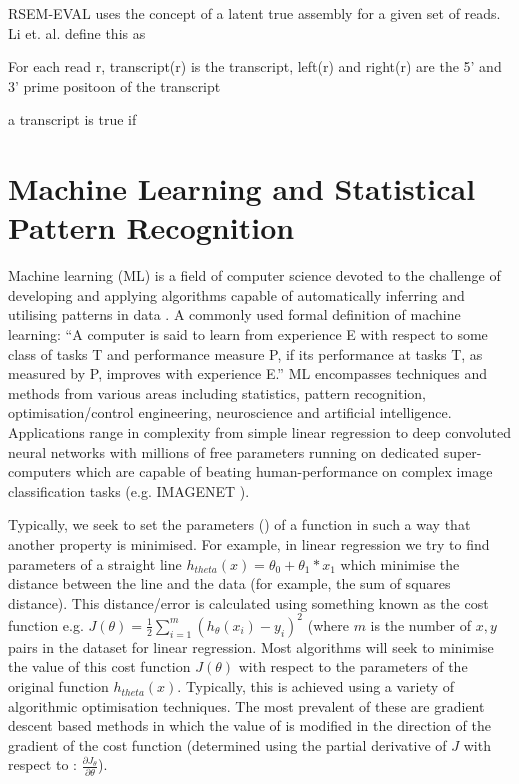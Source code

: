 

RSEM-EVAL uses the concept of a latent true assembly for a given set of 
reads.  Li et. al. define this as 

For each read r, transcript(r) is the transcript, left(r) and right(r) are the 5' and 3' prime
positoon of the transcript 

a transcript is true if 



\section{Machine Learning and Statistical Pattern Recognition}

Machine learning (ML) is a field of computer science 
devoted to the challenge of developing and applying algorithms capable of 
automatically inferring and utilising patterns in data \citep{Murphy2012}.
A commonly used formal definition of machine learning:
``A computer is said to learn from experience E with respect to some class of tasks 
T and performance measure P, if its performance at tasks T, as measured by P, improves 
with experience E.'' \citep{Mitchell1997}
ML encompasses techniques and methods from various areas including statistics,
pattern recognition, optimisation/control engineering, neuroscience and artificial intelligence.
Applications range in complexity from simple linear regression to deep convoluted neural networks 
with millions of free parameters running on dedicated super-computers \citep{Wu2014} 
which are capable of beating human-performance on complex image classification tasks 
(e.g. IMAGENET \citep{Berg2014,He2015}).

Typically, we seek to set the parameters (\theta) of a function in such a way
that another property is minimised.  For example, in linear regression we try to find 
parameters of a straight line \(h_{theta}(x) = \theta_{0} + \theta_{1} * x_{1}\) which minimise the distance
between the line and the data (for example, the sum of squares distance).
This distance/error is calculated using something known as the cost function e.g. \(J(\theta) = \frac{1}{2} \sum^{m}_{i=1} (h_{\theta}(x_{i}) - y_{i})^2\) (where \(m\) is the number of \(x, y\) pairs in the dataset for linear regression.  
Most algorithms will seek to minimise the value of this cost function \(J(\theta)\) with respect to 
the parameters of the original function \(h_{theta}(x)\).  Typically, this is achieved using a variety of algorithmic optimisation techniques.
The most prevalent of these are gradient descent based methods in which the value of \theta is modified 
in the direction of the gradient of the cost function (determined using the partial derivative of \(J\) with respect to \theta: \(\frac{\partial J_{\theta}}{\partial\theta}\)).  


